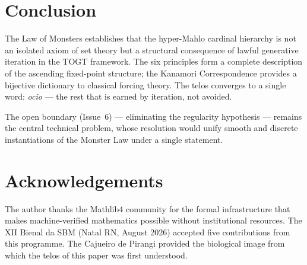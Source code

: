\documentclass[12pt,a4paper]{amsart}
\theoremstyle{definition}
\theoremstyle{remark}
\begin{document}
\section{Conclusion}\label{sec:conclusion}

The Law of Monsters establishes that the hyper-Mahlo cardinal hierarchy is not an
isolated axiom of set theory but a structural consequence of lawful generative
iteration in the TOGT framework. The six principles form a complete description of
the ascending fixed-point structure; the Kanamori Correspondence provides a bijective
dictionary to classical forcing theory. The telos converges to a single word:
\emph{ocio} --- the rest that is earned by iteration, not avoided.

The open boundary (Issue~6) --- eliminating the regularity hypothesis --- remains the
central technical problem, whose resolution would unify smooth and discrete
instantiations of the Monster Law under a single statement.

\section*{Acknowledgements}
The author thanks the Mathlib4 community for the formal infrastructure that makes
machine-verified mathematics possible without institutional resources. The XII Bienal
da SBM (Natal RN, August 2026) accepted five contributions from this programme.
The Cajueiro de Pirangi provided the biological image from which the telos of this
paper was first understood.
\end{document}
